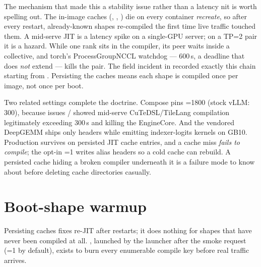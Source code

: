 The mechanism that made this a stability issue rather than a latency nit is
worth spelling out. The in-image caches (,
, ) die on
every container \emph{recreate}, so after every restart, already-known shapes
re-compiled the first time live traffic touched them. A mid-serve JIT is a
latency spike on a single-GPU server; on a TP=2 pair it is a hazard. While
one rank sits in the compiler, its peer waits inside a collective, and
torch's ProcessGroupNCCL watchdog --- 600\,s, a deadline that
 does \emph{not} extend --- kills
the pair. The field incident in  recorded exactly this chain
starting from . Persisting the caches
means each shape is compiled once per image, not once per boot.

Two related settings complete the doctrine. Compose pins
=1800 (stock vLLM: 300), because
issues / showed mid-serve CuTeDSL/TileLang compilation
legitimately exceeding 300\,s and killing the EngineCore. And the vendored
DeepGEMM ships only  headers while emitting 
indexer-logits kernels on GB10. Production survives on persisted JIT cache
entries, and a cache miss \emph{fails to compile}; the opt-in
=1 writes alias headers so a cold
cache can rebuild. A persisted cache hiding a broken compiler underneath it is
a failure mode to know about before deleting cache directories casually.

\section{Boot-shape warmup}
\label{sec:ops-warmup}

Persisting caches fixes re-JIT after restarts; it does nothing for shapes that
have never been compiled at all. ,
launched by the launcher after the smoke request
(=1 by default), exists to burn every
enumerable compile key before real traffic arrives.

